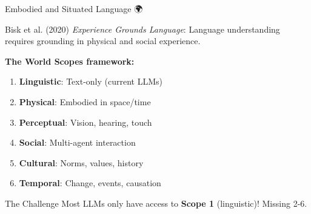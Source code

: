 \documentclass[aspectratio=169]{beamer}
\begin{document}
\begin{frame}[shrink=10]{Embodied and Situated Language 🌍}
\small
    \begin{block}{Bisk et al. (2020)}
        \textit{Experience Grounds Language}: Language understanding requires grounding in physical and social experience.
    \end{block}

    \vspace{0.3cm}

    \textbf{The World Scopes framework:}

    \begin{enumerate}\setlength{\itemsep}{0pt}
        \item \textbf{Linguistic}: Text-only (current LLMs)
        \item \textbf{Physical}: Embodied in space/time
        \item \textbf{Perceptual}: Vision, hearing, touch
        \item \textbf{Social}: Multi-agent interaction
        \item \textbf{Cultural}: Norms, values, history
        \item \textbf{Temporal}: Change, events, causation
    \end{enumerate}

    \vspace{0.3cm}

    \begin{alertblock}{The Challenge}
        Most LLMs only have access to \textbf{Scope 1} (linguistic)! Missing 2-6.
    \end{alertblock}
\end{frame}
\end{document}

